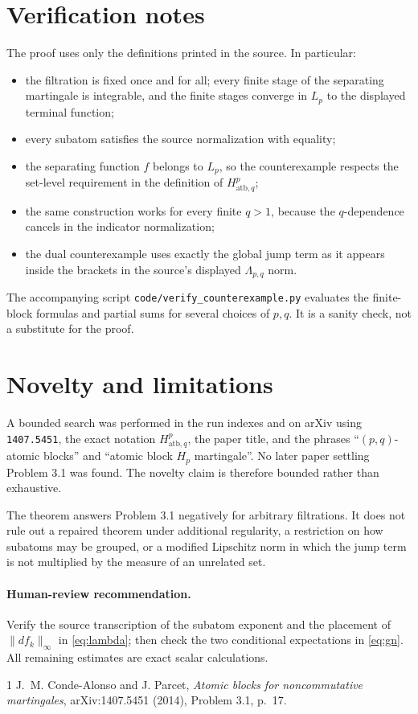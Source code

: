 \documentclass[11pt]{article}
\newcommand{\1}{\mathbf 1}
\begin{document}
\section{Verification notes}

The proof uses only the definitions printed in the source.  In particular:
\begin{itemize}
\item the filtration is fixed once and for all; every finite stage of the
      separating martingale is integrable, and the finite stages converge in
      \(L_p\) to the displayed terminal function;
\item every subatom satisfies the source normalization with equality;
\item the separating function \(f\) belongs to \(L_p\), so the counterexample
      respects the set-level requirement in the definition of
      \(H^p_{\mathrm{atb},q}\);
\item the same construction works for every finite \(q>1\), because the
      \(q\)-dependence cancels in the indicator normalization;
\item the dual counterexample uses exactly the global jump term as it appears
      inside the brackets in the source's displayed \(\Lambda_{p,q}\) norm.
\end{itemize}

The accompanying script \texttt{code/verify\_counterexample.py} evaluates the
finite-block formulas and partial sums for several choices of \(p,q\).  It is a
sanity check, not a substitute for the proof.

\section{Novelty and limitations}

A bounded search was performed in the run indexes and on arXiv using
\texttt{1407.5451}, the exact notation \(H^p_{\mathrm{atb},q}\), the paper
title, and the phrases ``\((p,q)\)-atomic blocks'' and ``atomic block
\(H_p\) martingale''.  No later paper settling Problem 3.1 was found.  The
novelty claim is therefore bounded rather than exhaustive.

The theorem answers Problem 3.1 negatively for arbitrary filtrations.  It does
not rule out a repaired theorem under additional regularity, a restriction on
how subatoms may be grouped, or a modified Lipschitz norm in which the jump
term is not multiplied by the measure of an unrelated set.

\paragraph{Human-review recommendation.}
Verify the source transcription of the subatom exponent and the placement of
\(\|df_k\|_\infty\) in \eqref{eq:lambda}; then check the two conditional
expectations in \eqref{eq:gn}.  All remaining estimates are exact scalar
calculations.

\begin{thebibliography}{1}
J.~M. Conde-Alonso and J. Parcet,
\emph{Atomic blocks for noncommutative martingales},
arXiv:1407.5451 (2014), Problem 3.1, p.~17.
\end{thebibliography}
\end{document}
